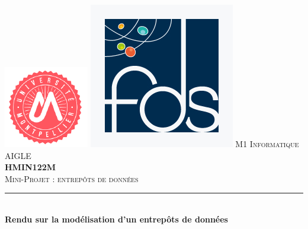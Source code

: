 \documentclass[a4paper,12pt]{report}
\begin{document}
\begin{titlepage}
\newcommand{\HRule}{\rule{\linewidth}{0.5mm}} %
\center
\includegraphics[scale=0.5]{images/umLogo.png} %
\hspace{\fill}
\includegraphics[scale=0.25]{images/fdsLogo.jpg} %
\textsc{\LARGE M1 Informatique AIGLE}\\[1cm]
\textsc{\Large \textbf{HMIN122M}}\\[0.25cm]
\textsc{\large Mini-Projet : entrepôts de données}\\[0.8cm]
\HRule \\[0.4cm]
{ \huge \bfseries Rendu sur la modélisation d'un entrepôts de données}\\[0.4cm]

\end{titlepage}
\end{document}
